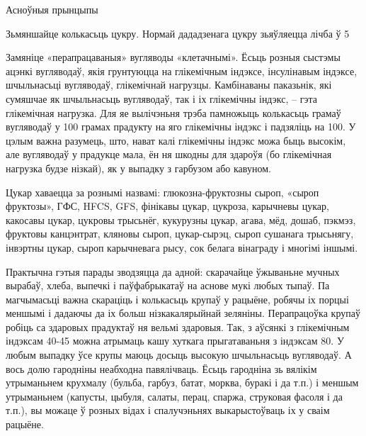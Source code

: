 Асноўныя прынцыпы

Зьмяншайце колькасьць цукру.
Нормай дададзенага цукру зьяўляецца лічба ў 5%

Замяніце «перапрацаваныя» вугляводы «клетачнымі».
Ёсьць розныя сыстэмы ацэнкі вугляводаў, якія грунтуюцца на глікемічным індэксе, інсулінавым індэксе, шчыльнасьці вугляводаў, глікемічнай нагрузцы. Камбінаваны паказьнік, які сумяшчае як шчыльнасьць вугляводаў, так і іх глікемічны індэкс, – гэта глікемічная нагрузка. Для яе вылічэньня трэба памножыць колькасьць грамаў вугляводаў у 100 грамах прадукту на яго глікемічны індэкс і падзяліць на 100. У цэлым важна разумець, што, нават калі глікемічны індэкс можа быць высокім, але вугляводаў у прадукце мала, ён ня шкодны для здароўя (бо глікемічная нагрузка будзе нізкай), як у выпадку з гарбузом або кавуном.

Цукар хаваецца за рознымі назвамі: глюкозна-фруктозны сыроп, «сыроп фруктозы», ГФС, HFCS, GFS, фінікавы цукар, цукроза, карычневы цукар, какосавы цукар, цукровы трысьнёг, кукурузны цукар, агава, мёд, дошаб, пэкмэз, фруктовы канцэнтрат, кляновы сыроп, цукар-сырэц, сыроп сушанага трысьнягу, інвэртны цукар, сыроп карычневага рысу, сок белага вінаграду і многімі іншымі.

Практычна гэтыя парады зводзяцца да адной: скарачайце ўжываньне мучных вырабаў, хлеба, выпечкі і паўфабрыкатаў на аснове мукі любых тыпаў. Па магчымасьці важна скараціць і колькасьць крупаў у рацыёне, робячы іх порцыі меншымі і дадаючы да іх больш нізкакалярыйнай зеляніны. Перапрацоўка крупаў робіць са здаровых прадуктаў ня вельмі здаровыя. Так, з аўсянкі з глікемічным індэксам 40-45 можна атрымаць кашу хуткага прыгатаваньня з індэксам 80. У любым выпадку ўсе крупы маюць досыць высокую шчыльнасьць вугляводаў. А вось долю гародніны неабходна павялічваць.
Ёсьць гародніна зь вялікім утрыманьнем крухмалу (бульба, гарбуз, батат, морква, буракі і да т.п.) і меншым утрыманьнем (капусты, цыбуля, салаты, перац, спаржа, струковая фасоля і да т.п.), вы можаце ў розных відах і спалучэньнях выкарыстоўваць іх у сваім рацыёне.


